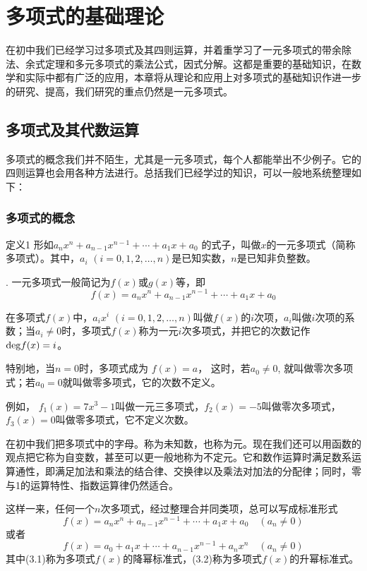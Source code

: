 
\chapter{多项式的基础理论}
在初中我们已经学习过多项式及其四则运算，并着重学习了一元多项式的带余除法、余式定理和多元多项式的乘法公式，因式分解。这都是重要的基础知识，在数学和实际中都有广泛的应用，本章将从理论和应用上对多项式的基础知识作进一步的研究、提高，我们研究的重点仍然是一元多项式。

\section{多项式及其代数运算}
多项式的概念我们并不陌生，尤其是一元多项式，每个人都能举出不少例子。它的四则运算也会用各种方法进行。总括我们已经学过的知识，可以一般地系统整理如下：

\subsection{多项式的概念}
\begin{blk}{定义1}
    形如$a_nx^n+a_{n-1}x^{n-1}+\cdots+a_1x +a_0$
的式子，叫做$x$的一元多项式（简称多项式）。其中，$a_i$ $(i=0, 1, 2,\ldots,n)$是已知实数，$n$是已知非负整数。
\end{blk}
.
一元多项式一般简记为$f(x)$或$g(x)$等，即
$$f (x) =a_nx^n+a_{n-1}x^{n-1}+\cdots+a_1x +a_0$$

在多项式$f(x)$中，$a_ix^i$ $(i=0, 1, 2,\ldots,n)$叫做$f(x)$的$i$次项，$a_i$叫做$i$次项的系数；当$a_i\ne 0$时，多项式$f(x)$称为一元$i$次多项式，并把它的次数记作${\rm deg} f(x)=i$。

特别地，当$n=0$时，多项式成为
$f (x) =a$，
这时，若$a_0\ne 0$, 就叫做零次多项式；若$a_0=0$就叫做零多项式，它的次数不定义。

例如，
$f_1(x)=7x^3-1$叫做一元三多项式，$f_2(x)=-5$叫做零次多项式，$f_3(x)=0$叫做零多项式，它不定义次数。

\begin{rmk}
    在初中我们把多项式中的字母。称为未知数，也称为元。现在我们还可以用函数的观点把它称为自变数，甚至可以更一般地称为不定元。它和数作运算时满足数系运算通性，即满足加法和乘法的结合律、交换律以及乘法对加法的分配律；同时，零与1的运算特性、指数运算律仍然适合。
\end{rmk}

这样一来，任何一个$n$次多项式，经过整理合并同类项，总可以写成标准形式
\begin{equation}
f(x)=a_nx^n+a_{n-1}x^{n-1}+\cdots+a_1x +a_0\quad (a_n\ne 0)
\end{equation}
或者
\begin{equation}
    f(x)=a_0+a_1x+\cdots+a_{n-1}x^{n-1}+a_nx^n\quad (a_n\ne 0)
\end{equation}
其中(3.1)称为多项式$f(x)$的降幂标准式，(3.2)称为多项式$f(x)$的升幂标准式。

